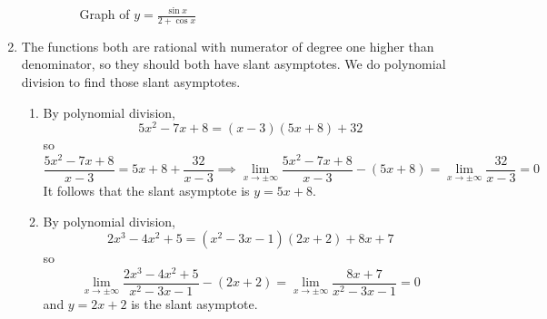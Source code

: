 \documentclass{article}
\newcommand{\ds}{\displaystyle}
\begin{document}
\begin{enumerate}
\begin{enumerate}
\begin{figure}[htbp]
      \caption{Graph of $\ds y=\frac{\sin x}{2+\cos x}$}
      \label{fig:sinxover2+cosx}
    \end{figure}    
  \end{enumerate}
\item %
  The functions both are rational with numerator of degree one higher
  than denominator, so they should both have slant asymptotes.  We do
  polynomial division to find those slant asymptotes.
  \begin{enumerate}
  \item %
    By polynomial division,
    \begin{displaymath}
      5x^2-7x+8 = (x-3)(5x+8)+32
    \end{displaymath}
    so
    \begin{displaymath}
      \frac{5x^2-7x+8}{x-3} = 5x+8 + \frac{32}{x-3}
      \implies
      \lim_{x\to\pm\infty} \frac{5x^2-7x+8}{x-3}-(5x+8)
      = \lim_{x\to\pm\infty}\frac{32}{x-3} = 0
    \end{displaymath}
    It follows that the slant asymptote is $y=5x+8$.
  \item %
    By polynomial division,
    \begin{displaymath}
      2x^3-4x^2+5 = (x^2-3x-1)(2x+2) + 8x +7
    \end{displaymath}
    so
    \begin{displaymath}
      \lim_{x\to\pm\infty} \frac{2x^3-4x^2+5}{x^2-3x-1} - (2x+2)
      = \lim_{x\to\pm\infty} \frac{8x+7}{x^2-3x-1}
      = 0
    \end{displaymath}
    and $y=2x+2$ is the slant asymptote.
  \end{enumerate}

\end{enumerate}
\end{document}
